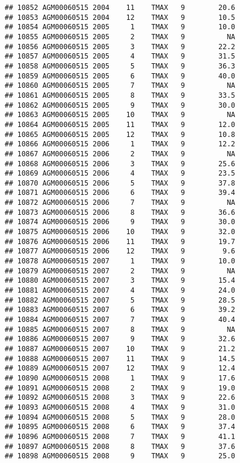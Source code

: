 \documentclass{article}\usepackage[]{graphicx}\usepackage[]{color}
\makeatletter
\newenvironment{kframe}{%
 \def\at@end@of@kframe{}%
 \ifinner\ifhmode%
  \def\at@end@of@kframe{\end{minipage}}%
  \begin{minipage}{\columnwidth}%
 \fi\fi%
 \def\FrameCommand##1{\hskip\@totalleftmargin \hskip-\fboxsep
 \colorbox{shadecolor}{##1}\hskip-\fboxsep
     \hskip-\linewidth \hskip-\@totalleftmargin \hskip\columnwidth}%
 \MakeFramed {\advance\hsize-\width
   \@totalleftmargin\z@ \linewidth\hsize
   \@setminipage}}%
 {\par\unskip\endMakeFramed%
 \at@end@of@kframe}
\newenvironment{knitrout}{}{} %
\makeatother
\begin{document}
\begin{knitrout}
\begin{kframe}
\begin{verbatim}
## 10852 AGM00060515 2004    11    TMAX   9        20.6
## 10853 AGM00060515 2004    12    TMAX   9        10.5
## 10854 AGM00060515 2005     1    TMAX   9        10.0
## 10855 AGM00060515 2005     2    TMAX   9          NA
## 10856 AGM00060515 2005     3    TMAX   9        22.2
## 10857 AGM00060515 2005     4    TMAX   9        31.5
## 10858 AGM00060515 2005     5    TMAX   9        36.3
## 10859 AGM00060515 2005     6    TMAX   9        40.0
## 10860 AGM00060515 2005     7    TMAX   9          NA
## 10861 AGM00060515 2005     8    TMAX   9        33.5
## 10862 AGM00060515 2005     9    TMAX   9        30.0
## 10863 AGM00060515 2005    10    TMAX   9          NA
## 10864 AGM00060515 2005    11    TMAX   9        12.0
## 10865 AGM00060515 2005    12    TMAX   9        10.8
## 10866 AGM00060515 2006     1    TMAX   9        12.2
## 10867 AGM00060515 2006     2    TMAX   9          NA
## 10868 AGM00060515 2006     3    TMAX   9        25.6
## 10869 AGM00060515 2006     4    TMAX   9        23.5
## 10870 AGM00060515 2006     5    TMAX   9        37.8
## 10871 AGM00060515 2006     6    TMAX   9        39.4
## 10872 AGM00060515 2006     7    TMAX   9          NA
## 10873 AGM00060515 2006     8    TMAX   9        36.6
## 10874 AGM00060515 2006     9    TMAX   9        30.0
## 10875 AGM00060515 2006    10    TMAX   9        32.0
## 10876 AGM00060515 2006    11    TMAX   9        19.7
## 10877 AGM00060515 2006    12    TMAX   9         9.6
## 10878 AGM00060515 2007     1    TMAX   9        10.0
## 10879 AGM00060515 2007     2    TMAX   9          NA
## 10880 AGM00060515 2007     3    TMAX   9        15.4
## 10881 AGM00060515 2007     4    TMAX   9        24.0
## 10882 AGM00060515 2007     5    TMAX   9        28.5
## 10883 AGM00060515 2007     6    TMAX   9        39.2
## 10884 AGM00060515 2007     7    TMAX   9        40.4
## 10885 AGM00060515 2007     8    TMAX   9          NA
## 10886 AGM00060515 2007     9    TMAX   9        32.6
## 10887 AGM00060515 2007    10    TMAX   9        21.2
## 10888 AGM00060515 2007    11    TMAX   9        14.5
## 10889 AGM00060515 2007    12    TMAX   9        12.4
## 10890 AGM00060515 2008     1    TMAX   9        17.6
## 10891 AGM00060515 2008     2    TMAX   9        19.0
## 10892 AGM00060515 2008     3    TMAX   9        22.6
## 10893 AGM00060515 2008     4    TMAX   9        31.0
## 10894 AGM00060515 2008     5    TMAX   9        28.0
## 10895 AGM00060515 2008     6    TMAX   9        37.4
## 10896 AGM00060515 2008     7    TMAX   9        41.1
## 10897 AGM00060515 2008     8    TMAX   9        37.6
## 10898 AGM00060515 2008     9    TMAX   9        25.0

\end{verbatim}
\end{kframe}
\end{knitrout}
\end{document}
